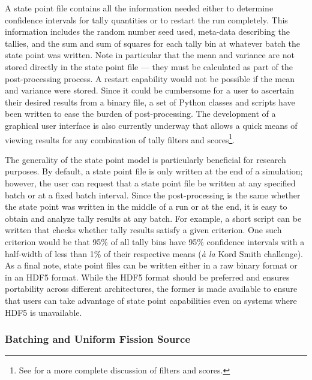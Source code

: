 \documentclass{ansconf}
\begin{document}
A state point file contains all the information needed either to determine
confidence intervals for tally quantities or to restart the run completely. This
information includes the random number seed used, meta-data describing the
tallies, and the sum and sum of squares for each tally bin at whatever batch the
state point was written. Note in particular that the mean and variance are not
stored directly in the state point file --- they must be calculated as part of
the post-processing process. A restart capability would not be possible if the
mean and variance were stored. Since it could be cumbersome for a user to
ascertain their desired results from a binary file, a set of Python classes and
scripts have been written to ease the burden of post-processing. The development
of a graphical user interface is also currently underway that allows a quick
means of viewing results for any combination of tally filters and
scores\footnote{See \cite{ane-romano-2013} for a more complete discussion of
  filters and scores.}.

The generality of the state point model is particularly beneficial for research
purposes. By default, a state point file is only written at the end of a
simulation; however, the user can request that a state point file be written at
any specified batch or at a fixed batch interval. Since the post-processing is
the same whether the state point was written in the middle of a run or at the
end, it is easy to obtain and analyze tally results at any batch. For example, a
short script can be written that checks whether tally results satisfy a given
criterion. One such criterion would be that 95\% of all tally bins have 95\%
confidence intervals with a half-width of less than 1\% of their respective
means (\emph{à la} Kord Smith challenge). As a final note, state point files can
be written either in a raw binary format or in an HDF5 format. While the HDF5
format should be preferred and ensures portability across different
architectures, the former is made available to ensure that users can take
advantage of state point capabilities even on systems where HDF5 is unavailable.

\subsubsection{Batching and Uniform Fission Source}
\end{document}
